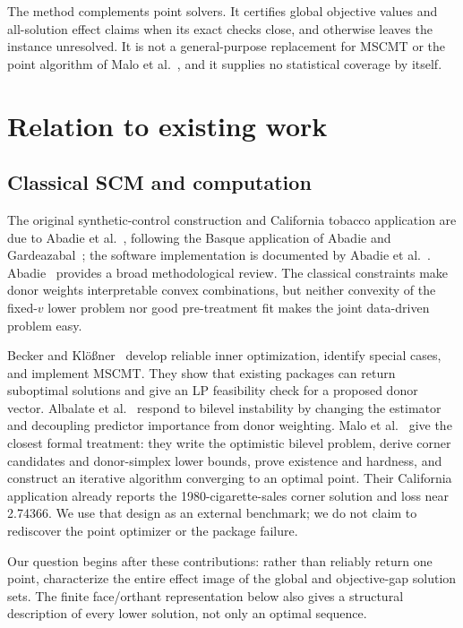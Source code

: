 \documentclass[10pt]{article}
\theoremstyle{definition}
\begin{document}
The method complements point solvers.  It certifies global objective values and
all-solution effect claims when its exact checks close, and otherwise leaves the
instance unresolved.  It is not a general-purpose replacement for MSCMT or the
point algorithm of Malo et al.~\cite{malo2024}, and it supplies no statistical
coverage by itself.

\section{Relation to existing work}

\subsection{Classical SCM and computation}

The original synthetic-control construction and California tobacco application
are due to Abadie et al.~\cite{abadie2010}, following the Basque application of
Abadie and Gardeazabal~\cite{abadie2003}; the software implementation is
documented by Abadie et al.~\cite{abadie2011}.  Abadie~\cite{abadie2021}
provides a broad methodological review.
The classical constraints make donor weights interpretable convex
combinations, but neither convexity of the fixed-$v$ lower problem nor good
pre-treatment fit makes the joint data-driven problem easy.

Becker and Kl\"o{\ss}ner~\cite{becker2018} develop reliable inner optimization,
identify special cases, and implement MSCMT.  They show that existing packages
can return suboptimal solutions and give an LP feasibility check for a proposed
donor vector.  Albalate et al.~\cite{albalate2021} respond to bilevel
instability by changing the estimator and decoupling predictor importance from
donor weighting.  Malo et al.~\cite{malo2024} give the closest formal treatment:
they write the optimistic bilevel problem, derive corner candidates and
donor-simplex lower bounds, prove existence and hardness, and construct an
iterative algorithm converging to an optimal point.
Their California application already reports the 1980-cigarette-sales corner
solution and loss near 2.74366.  We use that design as an external benchmark;
we do not claim to rediscover the point optimizer or the package failure.

Our question begins after these contributions: rather than reliably return one
point, characterize the entire effect image of the global and objective-gap
solution sets.  The finite face/orthant representation below also gives a
structural description of every lower solution, not only an optimal sequence.
\end{document}

